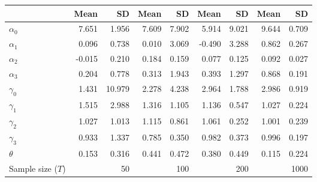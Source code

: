 
\begin{tabular}[t]{lrrrrrrrr}
\toprule
  & Mean & SD & Mean  & SD  & Mean   & SD   & Mean    & SD   \\
\midrule
$\alpha_{0}$ & 7.651 & 1.956 & 7.609 & 7.902 & 5.914 & 9.021 & 9.644 & 0.709\\
$\alpha_{1}$ & 0.096 & 0.738 & 0.010 & 3.069 & -0.490 & 3.288 & 0.862 & 0.267\\
$\alpha_{2}$ & -0.015 & 0.210 & 0.184 & 0.159 & 0.077 & 0.125 & 0.092 & 0.027\\
$\alpha_{3}$ & 0.204 & 0.778 & 0.313 & 1.943 & 0.393 & 1.297 & 0.868 & 0.191\\
$\gamma_{0}$ & 1.431 & 10.979 & 2.278 & 4.238 & 2.964 & 1.788 & 2.986 & 0.919\\
$\gamma_{1}$ & 1.515 & 2.988 & 1.316 & 1.105 & 1.136 & 0.547 & 1.027 & 0.224\\
$\gamma_{2}$ & 1.027 & 1.013 & 1.115 & 0.861 & 1.061 & 0.252 & 1.001 & 0.239\\
$\gamma_{3}$ & 0.933 & 1.337 & 0.785 & 0.350 & 0.982 & 0.373 & 0.996 & 0.197\\
$\theta$ & 0.153 & 0.316 & 0.441 & 0.472 & 0.380 & 0.449 & 0.115 & 0.224\\
Sample size ($T$) &  & 50 &  & 100 &  & 200 &  & 1000\\
\bottomrule
\end{tabular}
